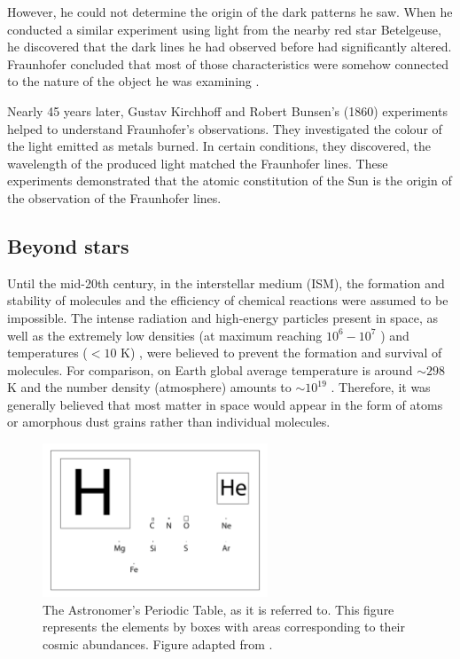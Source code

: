 However, he could not determine the origin of the dark patterns he saw. When he conducted a similar experiment using light from the nearby red star Betelgeuse, he discovered that the dark lines he had observed before had significantly altered. Fraunhofer concluded that most of those characteristics were somehow connected to the nature of the object he was examining \cite{tennyson_astronomical_2005}.

Nearly 45 years later, Gustav Kirchhoff and Robert Bunsen's \cite{kirchhoff_chemical_1860} (1860) experiments helped to understand Fraunhofer's observations. They investigated the colour of the light emitted as metals burned. In certain conditions, they discovered, the wavelength of the produced light matched the Fraunhofer lines. These experiments demonstrated that the atomic constitution of the Sun is the origin of the observation of the Fraunhofer lines. 

\subsection{Beyond stars}
Until the mid-20th century, in the interstellar medium (ISM), the formation and stability of molecules and the efficiency of chemical reactions were assumed to be impossible. The intense radiation and high-energy particles present in space, as well as the extremely low densities (at maximum reaching $10^6 - 10^7$ \percc) and temperatures ($<10$ K) \cite{harju_detection_2008}, were believed to prevent the formation and survival of molecules. For comparison, on Earth global average temperature is around $\sim 298$ K and the number density (atmosphere) amounts to $\sim 10^{19}$ \percc. Therefore, it was generally believed that most matter in space would appear in the form of atoms or amorphous dust grains rather than individual molecules.

\begin{figure}[!htb]
    \centering
    \includegraphics[width=0.6\textwidth]{figures/intro/astro-periodic-table.png}
    \caption{The Astronomer's Periodic Table, as it is referred to. This figure represents the elements by boxes with areas corresponding to their cosmic abundances. Figure adapted from \citet{mccall_optical_2005}.}
    \label{fig:astrochemistry-astro-periodic-table}
\end{figure}

